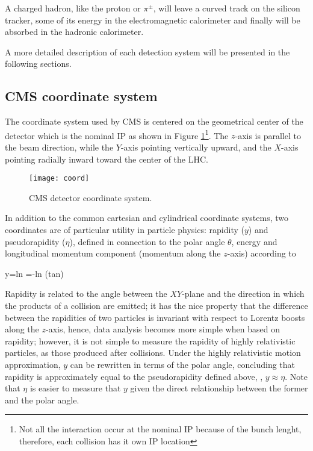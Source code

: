 A charged hadron, like the proton or $\pi^\pm$, will leave a curved track on the silicon tracker, some of its energy in the electromagnetic calorimeter and finally will be absorbed in the hadronic calorimeter.

A more detailed description of each detection system will be presented in the following sections. 

\subsection{CMS coordinate system}

The coordinate system used by CMS is centered on the geometrical center of the detector which is the nominal IP as shown in Figure \ref{fig:coord}\footnote{Not all the \pp interaction occur at the nominal IP because of the bunch lenght, therefore, each \pp collision has it own IP location}. The $z$-axis is parallel to the beam direction, while the $Y$-axis pointing vertically upward, and the $X$-axis pointing radially inward toward the center of the LHC.

\begin{figure}[h!]
  \centering
  \texttt{[image: coord]}
  \caption[CMS detector coordinate system]{CMS detector coordinate system.}
  \label{fig:coord}
\end{figure}

In addition to the common cartesian and cylindrical coordinate systems, two coordinates are of particular utility in particle physics: rapidity ($y$) and pseudorapidity ($\eta$), defined in connection to the polar angle $\theta$, energy and longitudinal momentum component (momentum along the $z$-axis) according to

\beqn
y=ln \qquad \eta=-ln \left(tan\right)
\label{eqn:eta}
\eeqn

Rapidity is related to the angle between the $XY$-plane and the direction in which the products of a collision are emitted; it has the nice property that the difference between the rapidities of two particles is invariant with respect to Lorentz boosts along the $z$-axis, hence, data analysis becomes more simple when based on rapidity; however, it is not simple to measure the rapidity of highly relativistic particles, as those produced after \pp collisions. Under the highly relativistic motion approximation, $y$ can be rewritten in terms of the polar angle, concluding that rapidity is approximately equal to the pseudorapidity defined above, \ie, $y\approx\eta$. Note that $\eta$ is easier to measure that $y$ given the direct relationship between the former and the polar angle.

